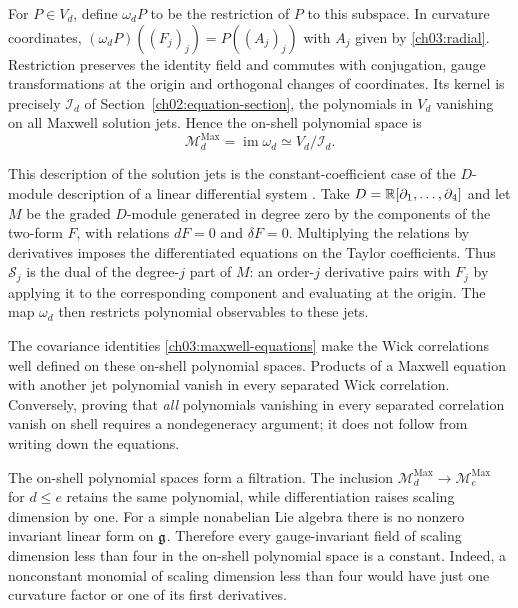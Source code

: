 For $P\in V_d$, define $\omega_dP$ to be the restriction of $P$ to
this subspace. In curvature coordinates,
$(\omega_dP)((F_j)_j)=P((A_j)_j)$ with $A_j$ given by \eqref{ch03:radial}.
Restriction preserves the identity field and commutes with conjugation, gauge
transformations at the origin and orthogonal changes of coordinates.
Its kernel is precisely $\mathcal I_d$ of Section~\ref{ch02:equation-section},
the polynomials in $V_d$ vanishing on all Maxwell solution jets. Hence
the on-shell polynomial space is
\begin{equation}\label{ch03:free-space}
 \mathcal M_d^{\mathrm{Max}}=\operatorname{im}\omega_d
 \simeq V_d/\mathcal I_d .
\end{equation}

This description of the solution jets is the constant-coefficient case
of the $D$-module description of a linear differential system
\cite[\S\,3, p.~84]{Malgrange1964}. Take
$D=\mathbb R[\partial_1,\ldots,\partial_4]$ and let $M$ be the graded
$D$-module generated in degree zero by the components of the two-form $F$,
with relations $dF=0$ and $\delta F=0$. Multiplying the relations by
derivatives imposes the differentiated equations on the Taylor coefficients.
Thus $\mathcal S_j$ is the dual of the degree-$j$ part of $M$: an
order-$j$ derivative pairs with $F_j$ by applying it to the corresponding
component and evaluating at the origin. The map $\omega_d$ then restricts
polynomial observables to these jets.

The covariance identities \eqref{ch03:maxwell-equations} make the Wick
correlations well defined on these on-shell polynomial spaces. Products
of a Maxwell equation with another jet polynomial vanish in every
separated Wick correlation. Conversely, proving that \emph{all}
polynomials vanishing in every separated correlation vanish on shell requires a nondegeneracy
argument; it does not follow from writing down the equations.

The on-shell polynomial spaces form a filtration. The inclusion
$\mathcal M_d^{\mathrm{Max}}\to\mathcal M_e^{\mathrm{Max}}$ for
$d\le e$ retains the same polynomial, while differentiation raises
scaling dimension by one. For a simple nonabelian Lie algebra there is no nonzero
invariant linear form on $\mathfrak g$. Therefore every gauge-invariant field
of scaling dimension less than four in the on-shell polynomial space is a constant.
Indeed, a nonconstant monomial of scaling dimension less than four would have just one curvature factor or one
of its first derivatives.

